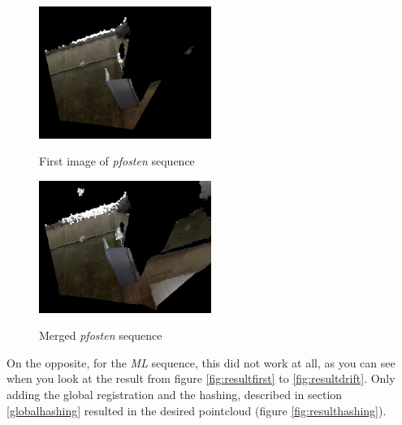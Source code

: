 \documentclass[10pt,twocolumn,letterpaper]{article}
\begin{document}
\begin{figure}
  \includegraphics[width=0.5\textwidth]{pfostenstart}
  \label{fig:pfostenstart}
  \caption{First image of \textit{pfosten} sequence}
\end{figure}

\begin{figure}
  \centering
  \includegraphics[width=0.5\textwidth]{pfostenend}
  \label{fig:pfostenend}
  \caption{Merged \textit{pfosten} sequence}
\end{figure}

On the opposite, for the \textit{ML} sequence, this did not work at all, as you can see when you look at the result from figure
\ref{fig:resultfirst} to \ref{fig:resultdrift}. Only adding the global registration and the hashing, described in section \ref{globalhashing}
resulted in the desired pointcloud (figure \ref{fig:resulthashing}).
\end{document}
